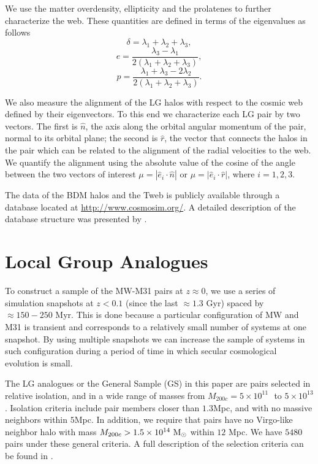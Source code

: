 \documentclass{emulateapj}
\newcommand{\mpc}{\rm{Mpc}}
\newcommand{\msun}{{\ifmmode{{\rm {M_{\odot}}}}\else{${\rm{M_{\odot}}}$}\fi}}
\begin{document}
We use the matter overdensity, ellipticity and the prolatenes to
further characterize the web. 
These quantities are defined in terms of the
eigenvalues as follows 
%
\begin{equation}
\delta = \lambda_1 + \lambda_2 + \lambda_3,
\end{equation}
%
\begin{equation}
e= \frac{\lambda_3 - \lambda_1}{2(\lambda_1 + \lambda_2 + \lambda_3)}, 
\end{equation}
%
\begin{equation}
p= \frac{\lambda_1 + \lambda_3 - 2\lambda_2}{2(\lambda_1 + \lambda_2 +
  \lambda_3)}.
\end{equation}

We also measure the alignment of the LG halos with respect to the
cosmic web defined by their eigenvectors.
To this end we characterize each LG pair by two vectors. 
The first is $\hat{n}$, the axis along the orbital angular
momentum of the pair, normal to its orbital plane; the second is
$\hat{r}$, the vector that connects the halos in the pair which can be
related to the alignment of the radial velocities to the web.
We quantify the alignment using the absolute value of the cosine of
the angle between the two vectors of interest $\mu=|\hat{e}_i \cdot
\hat{n}|$ or $\mu=|\hat{e}_i\cdot \hat{r}|$, where $i=1,2,3$. 


The data of the BDM halos and the Tweb is publicly available through
a database located at \url{http://www.cosmosim.org/}. A detailed
description of the database structure was presented by \cite{Riebe2013}.

\section{Local Group Analogues}
\label{sec:lg_analogues}

To construct a sample of the MW-M31 pairs at $z\approx 0$, we use a
series of simulation snapshots  at $z<0.1$ (since the last $\approx
1.3$ Gyr) spaced by $\approx 150-250$ Myr. 
This is done because a particular configuration of MW and M31 is transient and
corresponds to a relatively small number of systems at one
snapshot. 
By using multiple snapshots we can increase the sample of systems in
such configuration during a period of time in which secular
cosmological evolution is small.  

The LG analogues or the General Sample (GS) in this paper are pairs selected in
relative isolation, and in a wide range of masses from  $M_{200c}=5
\times 10^{11}$ \msun $ $ to $ 5 \times 10^{13}$ \msun.  
Isolation criteria include pair members closer than $1.3$\mpc,
 and with no massive neighbors within $5$\mpc.
In addition, we require that pairs have no Virgo-like neighbor halo
with mass $M_{200c}>1.5 \times 10^{14}\ \rm M_{\odot}$ within $12$
Mpc.  
We have $5480$ pairs under these general criteria. 
A full description of the selection criteria can be found in
\citet{lganalogues,sat}.   
\end{document}
